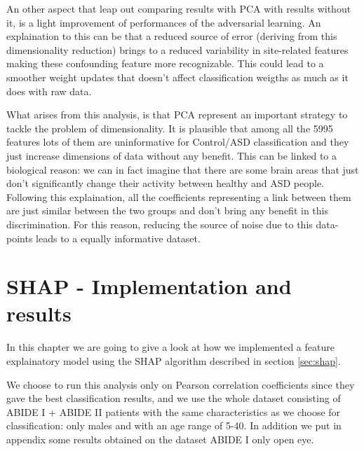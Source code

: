 \documentclass[10pt]{report}
\begin{document}
An other aspect that leap out comparing results with PCA with results without it, is a light improvement of performances of the adversarial learning.
An explaination to this can be that a reduced source of error (deriving from this dimensionality reduction) brings to a reduced variability in site-related features making these confounding feature more recognizable. This could lead to a smoother weight updates that doesn't affect classification weigths as much as it does with raw data.

What arises from this analysis, is that PCA represent an important strategy to tackle the problem of dimensionality. It is plausible tbat among all the 5995 features lots of them are uninformative for Control/ASD classification and they just increase dimensions of data without any benefit. This can be linked to a biological reason: we can in fact imagine that there are some brain areas that just don't significantly change their activity between healthy and ASD people. Following this explaination, all the coefficients representing a link between them are just similar between the two groups and don't bring any benefit in this discrimination. For this reason, reducing the source of noise due to this data-points leads to a equally informative dataset.

\newpage


\chapter{SHAP - Implementation and results}

In this chapter we are going to give a look at how we implemented a feature explainatory model using the SHAP algorithm described in section \ref{sec:shap}.

We choose to run this analysis only on Pearson correlation coefficients since they gave the best classification results, and we use the whole dataset consisting of ABIDE I + ABIDE II patients with the same characteristics as we choose for classification: only males and with an age range of 5-40.
In addition we put in appendix some results obtained on the dataset ABIDE I only open eye.
\end{document}
